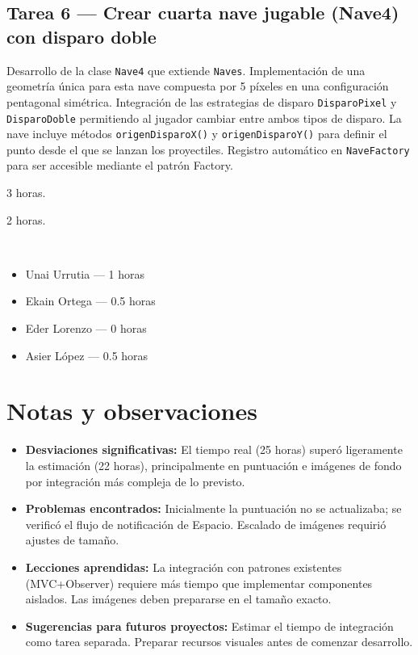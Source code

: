 \documentclass[12pt, a4paper]{article}
\begin{document}
\subsection*{Tarea 6 — Crear cuarta nave jugable (Nave4) con disparo doble}
\begin{description}[leftmargin=2em, style=nextline]
    \item[\textbf{Descripción:}] Desarrollo de la clase \texttt{Nave4} que extiende \texttt{Naves}. Implementación de una geometría única para esta nave compuesta por 5 píxeles en una configuración pentagonal simétrica. Integración de las estrategias de disparo \texttt{DisparoPixel} y \texttt{DisparoDoble} permitiendo al jugador cambiar entre ambos tipos de disparo. La nave incluye métodos \texttt{origenDisparoX()} y \texttt{origenDisparoY()} para definir el punto desde el que se lanzan los proyectiles. Registro automático en \texttt{NaveFactory} para ser accesible mediante el patrón Factory.
    \item[\textbf{Tiempo estimado:}] 3 horas.
    \item[\textbf{Tiempo real:}] 2 horas.
    \item[\textbf{Responsables y dedicación:}]~
        \begin{itemize}[leftmargin=1em, nosep]
            \item Unai Urrutia — 1 horas
            \item Ekain Ortega — 0.5 horas
            \item Eder Lorenzo — 0 horas
            \item Asier López — 0.5 horas
        \end{itemize}
\end{description}

\vspace{0.8em}

\section{Notas y observaciones}

\begin{itemize}[leftmargin=2em]
    \item \textbf{Desviaciones significativas:} El tiempo real (25 horas) superó ligeramente la estimación (22 horas), principalmente en puntuación e imágenes de fondo por integración más compleja de lo previsto.
    \item \textbf{Problemas encontrados:} Inicialmente la puntuación no se actualizaba; se verificó el flujo de notificación de Espacio. Escalado de imágenes requirió ajustes de tamaño.
    \item \textbf{Lecciones aprendidas:} La integración con patrones existentes (MVC+Observer) requiere más tiempo que implementar componentes aislados. Las imágenes deben prepararse en el tamaño exacto.
    \item \textbf{Sugerencias para futuros proyectos:} Estimar el tiempo de integración como tarea separada. Preparar recursos visuales antes de comenzar desarrollo.
\end{itemize}
\end{document}
